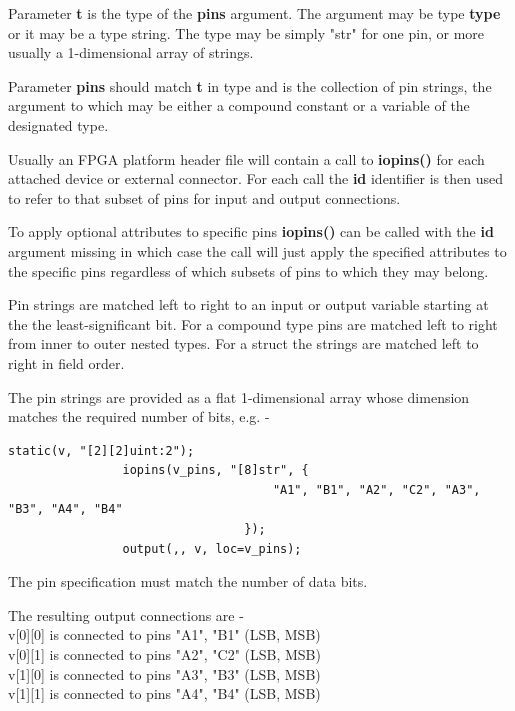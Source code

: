             Parameter {\bf t} is the type of the {\bf pins} argument. The argument
            may be type {\bf type} or it may be a type string. The type may be
            simply "str" for one pin, or more usually a 1-dimensional array of
            strings.

            Parameter {\bf pins} should match {\bf t} in type and is the collection
            of pin strings, the argument to which may be either a compound constant
            or a variable of the designated type.
            
            Usually an FPGA platform header file will contain a call to
            {\bf iopins()} for each attached device or external connector.
            For each call the {\bf id} identifier is then used to refer to that
            subset of pins for input and output connections.
            
            To apply optional attributes to specific pins {\bf iopins()} can be
            called with the {\bf id} argument missing in which case the call will
            just apply the specified attributes to the specific pins regardless
            of which subsets of pins to which they may belong.
            
            Pin strings are matched left to right to an input or output variable
            starting at the the least-significant bit. For a compound type pins
            are matched left to right from inner to outer nested types. For a
            struct the strings are matched left to right in field order.
            
            The pin strings are provided as a flat 1-dimensional array
            whose dimension matches the required number of bits, e.g. -

            \begin{lstlisting}[gobble=12, language=threepl]
                static(v, "[2][2]uint:2");
                iopins(v_pins, "[8]str", {
                                     "A1", "B1", "A2", "C2", "A3", "B3", "A4", "B4"
                                 });
                output(,, v, loc=v_pins);
            \end{lstlisting}
            The pin specification must match the number of data bits.

            The resulting output connections are -\\
            v[0][0] is connected to pins "A1", "B1" (LSB, MSB)\\
            v[0][1] is connected to pins "A2", "C2" (LSB, MSB)\\
            v[1][0] is connected to pins "A3", "B3" (LSB, MSB)\\
            v[1][1] is connected to pins "A4", "B4" (LSB, MSB)\\
            
